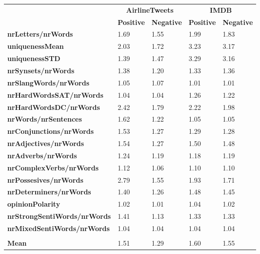 \begin{tabular}{|l|l|l|l|l|} \cline{2-5}
\multicolumn{1}{c|}{} & \multicolumn{2}{c|}{\textbf{AirlineTweets}} & \multicolumn{2}{c|}{\textbf{IMDB}}\\ \cline{2-5}
\multicolumn{1}{c|}{} & \textbf{Positive} & \textbf{Negative} & \textbf{Positive} & \textbf{Negative} \\ \hline
\textbf{nrLetters/nrWords} & 1.69 & 1.55 & 1.99 & 1.83 \\ \hline
\textbf{uniquenessMean} & 2.03 & 1.72 & 3.23 & 3.17 \\ \hline
\textbf{uniquenessSTD} & 1.39 & 1.47 & 3.29 & 3.16 \\ \hline
\textbf{nrSynsets/nrWords} & 1.38 & 1.20 & 1.33 & 1.36 \\ \hline
\textbf{nrSlangWords/nrWords} & 1.05 & 1.07 & 1.01 & 1.01 \\ \hline
\textbf{nrHardWordsSAT/nrWords} & 1.04 & 1.04 & 1.26 & 1.22 \\ \hline
\textbf{nrHardWordsDC/nrWords} & 2.42 & 1.79 & 2.22 & 1.98 \\ \hline
\textbf{nrWords/nrSentences} & 1.62 & 1.22 & 1.05 & 1.05 \\ \hline
\textbf{nrConjunctions/nrWords} & 1.53 & 1.27 & 1.29 & 1.28 \\ \hline
\textbf{nrAdjectives/nrWords} & 1.54 & 1.27 & 1.50 & 1.48 \\ \hline
\textbf{nrAdverbs/nrWords} & 1.24 & 1.19 & 1.18 & 1.19 \\ \hline
\textbf{nrComplexVerbs/nrWords} & 1.12 & 1.06 & 1.10 & 1.10 \\ \hline
\textbf{nrPossesives/nrWords} & 2.79 & 1.55 & 1.93 & 1.71 \\ \hline
\textbf{nrDeterminers/nrWords} & 1.40 & 1.26 & 1.48 & 1.45 \\ \hline
\textbf{opinionPolarity} & 1.02 & 1.01 & 1.04 & 1.02 \\ \hline
\textbf{nrStrongSentiWords/nrWords} & 1.41 & 1.13 & 1.33 & 1.33 \\ \hline
\textbf{nrMixedSentiWords/nrWords} & 1.04 & 1.04 & 1.04 & 1.04\\ \hline
 \multicolumn{3}{c}{} \\ [-1.5ex] \hline
\textbf{Mean} & 1.51 & 1.29 & 1.60 & 1.55 \\ \hline
\end{tabular}